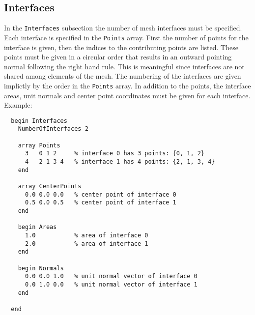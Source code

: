 \subsection{Interfaces}
\label{sec:interfaces}
In the \texttt{Interfaces} subsection the number of mesh interfaces
must be specified. Each interface is specified in the \texttt{Points}
array. First the number of points for the interface is given, then the
indices to the contributing points are listed. These points must be
given in a circular order that results in an outward pointing normal
following the right hand rule. This is meaningful since interfaces are
not shared among elements of the mesh. The numbering of the interfaces
are given implictly by the order in the \texttt{Points} array. In
addition to the points, the interface areas, unit normals and center
point coordinates must be given for each interface.  Example:
%
\begin{verbatim}
  begin Interfaces
    NumberOfInterfaces 2

    array Points
      3   0 1 2     % interface 0 has 3 points: {0, 1, 2}
      4   2 1 3 4   % interface 1 has 4 points: {2, 1, 3, 4}
    end

    array CenterPoints
      0.0 0.0 0.0   % center point of interface 0
      0.5 0.0 0.5   % center point of interface 1
    end             
                    
    begin Areas     
      1.0           % area of interface 0
      2.0           % area of interface 1
    end             
                    
    begin Normals   
      0.0 0.0 1.0   % unit normal vector of interface 0
      0.0 1.0 0.0   % unit normal vector of interface 1
    end

  end
\end{verbatim}

